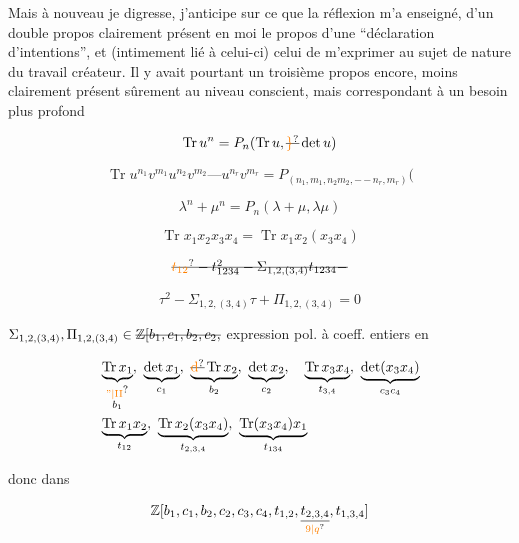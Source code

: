 Mais à nouveau je  digresse,  j'anticipe sur ce que la réflexion m'a enseigné,    d'un double propos clairement présent en moi   le propos d'une ``déclaration d'intentions'', et (intimement lié à celui-ci) celui de m'exprimer au sujet de  nature du travail créateur. Il y avait pourtant un troisième propos encore, moins clairement présent sûrement au niveau conscient, mais correspondant à un besoin plus profond

\[
 \operatorname{Tr}u^n=P_n(\operatorname{Tr}u,\deleted{\unsure{\}}}\det u)
\]

\[
 \operatorname{Tr}u^{n_1}v^{m_1}u^{n_2}v^{m_2}\mathord{\text{---}}u^{n_r}v^{m_r}
 =P_{(n_1,m_1,n_2m_2,\mathord{-}\,\mathord{-}\,n_r,m_r)}(
\]

\[
 \lambda^n+\mu^n=P_n(\lambda+\mu,\lambda\mu)
\]

\[
 \operatorname{Tr}x_1x_2x_3x_4=\operatorname{Tr}x_1x_2(x_3x_4)
\]

\[
 \deleted{\unsure{t_{12}}-t_{1234}^{2}-\Sigma_{1,2,(3,4)}t_{1234}-}
\]

\[
 \tau^2-\Sigma_{1,2,(3,4)}\tau+\Pi_{1,2,(3,4)}=0
\]

$\Sigma_{1,2,(3,4)},\Pi_{1,2,(3,4)}\in\deleted{\mathbb Z[b_1,c_1,b_2,c_2,}$ expression pol. à coeff. entiers en

\[
 \begin{aligned}
 &\underbrace{\operatorname{Tr}x_1}_{\substack{\unsure{\text{''}|\mathrm{II}}\\ b_1}},\ \underbrace{\det x_1}_{c_1},\
 \underbrace{\deleted{\unsure{\mathrm d}}\operatorname{Tr}x_2}_{b_2},\
 \underbrace{\det x_2}_{c_2},\quad\underbrace{\operatorname{Tr}x_3x_4}_{t_{3,4}},\
 \underbrace{\det(x_3x_4)}_{c_3c_4}\\
 &\underbrace{\operatorname{Tr}x_1x_2}_{t_{12}},\
 \underbrace{\operatorname{Tr}x_2(x_3x_4)}_{t_{2,3,4}},\
 \underbrace{\operatorname{Tr}(x_3x_4)x_1}_{t_{134}}
 \end{aligned}
\]

donc dans

\[
 \mathbb Z[b_1,c_1,b_2,c_2,c_3,c_4,t_{1,2},
 \underset{\unsure{9|q}}{\underline{t_{2,3,4}}},t_{1,3,4}]
\]

